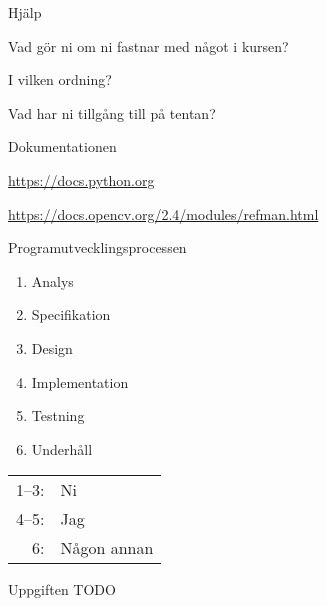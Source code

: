 \documentclass{beamer}
\begin{document}
  \begin{frame}{Hjälp}

    Vad gör ni om ni fastnar med något i kursen?

    I vilken ordning?

    \pause{}

    Vad har ni tillgång till på tentan?

  \end{frame}

  \begin{frame}{Dokumentationen}

    \url{https://docs.python.org}

    \url{https://docs.opencv.org/2.4/modules/refman.html}

  \end{frame}

  \begin{frame}{Programutvecklingsprocessen}

    \begin{enumerate}
      \item Analys
      \item Specifikation
      \item Design
      \item Implementation
      \item Testning
      \item Underhåll
    \end{enumerate}

    \begin{tabular}{r l}
    1--3: & Ni \\
    4--5: & Jag \\
    6: & Någon annan
    \end{tabular}

  \end{frame}

  \begin{frame}{Uppgiften}
    TODO
  \end{frame}
\end{document}
